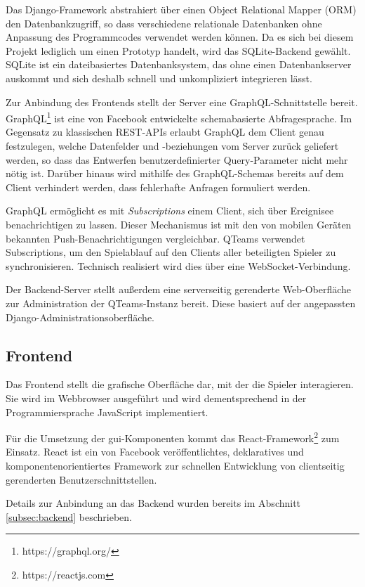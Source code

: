 \documentclass[a4paper,11pt,listof=numbered,glossary=totoc,parskip=half,toc=bib]{scrreprt}
\begin{document}
	Das Django-Framework abstrahiert über einen Object Relational Mapper (ORM) den Datenbankzugriff, so dass verschiedene relationale Datenbanken ohne Anpassung des Programmcodes verwendet werden können. Da es sich bei diesem Projekt lediglich um einen Prototyp handelt, wird das SQLite-Backend gewählt. SQLite ist ein dateibasiertes Datenbanksystem, das ohne einen Datenbankserver auskommt und sich deshalb schnell und unkompliziert integrieren lässt.
	
	Zur Anbindung des Frontends stellt der Server eine GraphQL-Schnittstelle bereit. GraphQL\footnote{https://graphql.org/} ist eine von Facebook entwickelte schemabasierte Abfragesprache. Im Gegensatz zu klassischen REST-APIs erlaubt GraphQL dem Client genau festzulegen, welche Datenfelder und -beziehungen vom Server zurück geliefert werden, so dass das Entwerfen benutzerdefinierter Query-Parameter nicht mehr nötig ist. Darüber hinaus wird mithilfe des GraphQL-Schemas bereits auf dem Client verhindert werden, dass fehlerhafte Anfragen formuliert werden.
	
	GraphQL ermöglicht es mit \textit{Subscriptions} einem Client, sich über Ereignisee benachrichtigen zu lassen. Dieser Mechanismus ist mit den von mobilen Geräten bekannten Push-Benachrichtigungen vergleichbar. QTeams verwendet Subscriptions, um den Spielablauf auf den Clients aller beteiligten Spieler zu synchronisieren. Technisch realisiert wird dies über eine WebSocket-Verbindung.

	Der Backend-Server stellt außerdem eine serverseitig gerenderte Web-Oberfläche zur Administration der QTeams-Instanz bereit. Diese basiert auf der angepassten Django-Administrationsoberfläche.
	
	\subsection{Frontend}
	Das Frontend stellt die grafische Oberfläche dar, mit der die Spieler interagieren. Sie wird im Webbrowser ausgeführt und wird dementsprechend in der Programmiersprache JavaScript implementiert.
	
	 Für die Umsetzung der \Gls{gui}-Komponenten kommt das React-Framework\footnote{https://reactjs.com} zum Einsatz. React ist ein von Facebook veröffentlichtes, deklaratives und komponentenorientiertes Framework zur schnellen Entwicklung von clientseitig gerenderten Benutzerschnittstellen.
	
	Details zur Anbindung an das Backend wurden bereits im Abschnitt \ref{subsec:backend} beschrieben.
\end{document}
